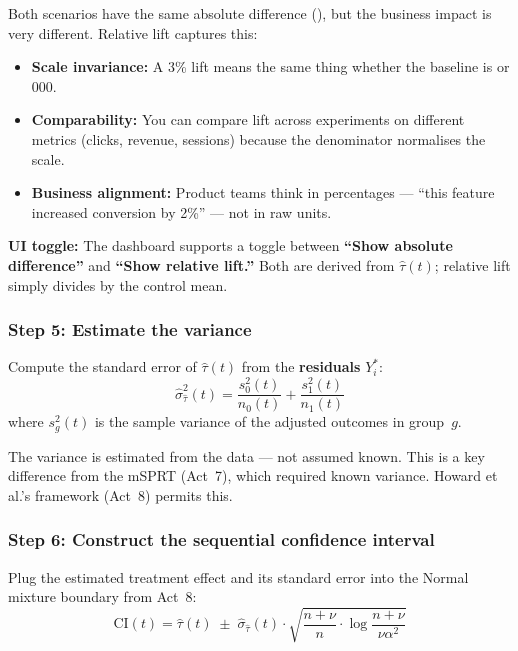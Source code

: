 \documentclass[12pt, a4paper]{article}
\begin{document}
Both scenarios have the same absolute difference (), but the
business impact is very different.  Relative lift captures this:

\begin{itemize}[nosep]
  \item \textbf{Scale invariance:} A 3\% lift means the same thing whether
        the baseline is  or 000.
  \item \textbf{Comparability:} You can compare lift across experiments on
        different metrics (clicks, revenue, sessions) because the denominator
        normalises the scale.
  \item \textbf{Business alignment:} Product teams think in percentages ---
        ``this feature increased conversion by 2\%'' --- not in raw units.
\end{itemize}

\textbf{UI toggle:} The dashboard supports a toggle between
\textbf{``Show absolute difference''} and \textbf{``Show relative lift.''}
Both are derived from $\hat{\tau}(t)$; relative lift simply divides by the
control mean.

\subsubsection*{Step 5: Estimate the variance}

Compute the standard error of $\hat{\tau}(t)$ from the \textbf{residuals}
$Y^*_i$:
\[
  \hat{\sigma}_{\hat{\tau}}^2(t) = \frac{s_0^2(t)}{n_0(t)} + \frac{s_1^2(t)}{n_1(t)}
\]
where $s_g^2(t)$ is the sample variance of the adjusted outcomes in group~$g$.

\begin{plainlanguage}
The variance is estimated from the data --- not assumed known.  This is a key
difference from the mSPRT (Act~7), which required known variance.  Howard et
al.'s framework (Act~8) permits this.
\end{plainlanguage}

\subsubsection*{Step 6: Construct the sequential confidence interval}

Plug the estimated treatment effect and its standard error into the Normal
mixture boundary from Act~8:
\[
  \boxed{\text{CI}(t) = \hat{\tau}(t) \;\pm\;
  \hat{\sigma}_{\hat{\tau}}(t) \cdot
  \sqrt{\frac{n + \nu}{n} \cdot \log\!\frac{n + \nu}{\nu \alpha^2}}}
\]
\end{document}
